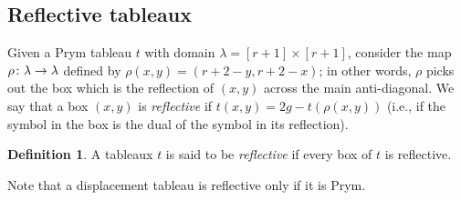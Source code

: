\documentclass[11pt,reqno]{amsart}
\newcommand*{\maps}{\nobreak\mskip2mu\mathpunct{}\nonscript
  \mkern-\thinmuskip{:}\mskip6muplus1mu\relax}
\newcommand*{\wti}[1]{\widetilde{#1}}
\newcommand{\caelan}[1]{\textcolor{orange}{\sf C: [#1]}}
\DeclareMathOperator{\Pic}{Pic}
\DeclareMathOperator{\Prym}{Prym}
\theoremstyle{definition}
\newtheorem{definition}{Definition}[section]
\theoremstyle{problem}
\theoremstyle{plain}
\theoremstyle{remark}
\theoremstyle{theorem}
\numberwithin{equation}{section}
\numberwithin{figure}{section}
\begin{document}



\subsection{Reflective tableaux}\label{sec:reflective}

Given a Prym tableau $t$ with domain
$\lambda = [r+1]\times[r+1]$, consider the map
$\rho\maps\lambda\to\lambda$ defined by $\rho(x,y)=(r+2-y, r+2-x)$; in
other words, $\rho$ picks out the box which is the reflection of
$(x,y)$ across the main anti-diagonal.  We say that a box $(x,y)$ is
\textit{reflective} if $t(x,y) = 2g - t(\rho(x,y))$ (i.e., if the
symbol in the box is the dual of the symbol in its reflection).

\begin{definition}
  A tableaux $t$ is said to be \textit{reflective} if 
  every box of $t$
  is reflective.
\end{definition}
\noindent Note that a displacement tableau is reflective only if it is Prym.
\end{document}
